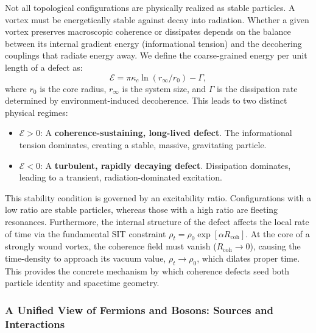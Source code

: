 Not all topological configurations are physically realized as stable particles. A vortex must be energetically stable against decay into radiation. Whether a given vortex preserves macroscopic coherence or dissipates depends on the balance between its internal gradient energy (informational tension) and the decohering couplings that radiate energy away. We define the coarse-grained energy per unit length of a defect as:
\begin{equation}
    \mathcal{E} = \pi\kappa_{c}\ln(r_{\infty}/r_{0}) - \Gamma,
\end{equation}
where $r_{0}$ is the core radius, $r_{\infty}$ is the system size, and $\Gamma$ is the dissipation rate determined by environment-induced decoherence. This leads to two distinct physical regimes:
\begin{itemize}
    \item $\mathcal{E} > 0$: A \textbf{coherence-sustaining, long-lived defect}. The informational tension dominates, creating a stable, massive, gravitating particle.
    \item $\mathcal{E} < 0$: A \textbf{turbulent, rapidly decaying defect}. Dissipation dominates, leading to a transient, radiation-dominated excitation.
\end{itemize}
This stability condition is governed by an excitability ratio. Configurations with a low ratio are stable particles, whereas those with a high ratio are fleeting resonances. Furthermore, the internal structure of the defect affects the local rate of time via the fundamental SIT constraint $\rho_{t} = \rho_{0}\exp[\alpha R_{\text{coh}}]$. At the core of a strongly wound vortex, the coherence field must vanish ($R_{\text{coh}} \rightarrow 0$), causing the time-density to approach its vacuum value, $\rho_{t} \rightarrow \rho_{0}$, which dilates proper time. This provides the concrete mechanism by which coherence defects seed both particle identity and spacetime geometry.

\subsubsection{A Unified View of Fermions and Bosons: Sources and Interactions}

